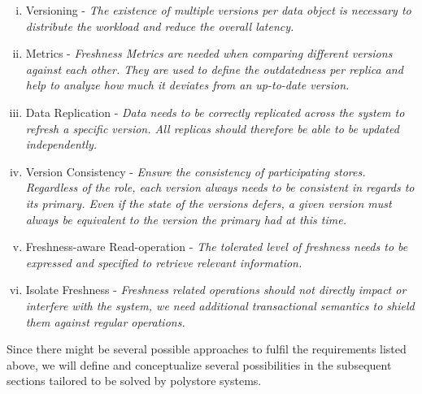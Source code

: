 \begin{enumerate}[(i)]
    \item Versioning -                      \textit{The existence of multiple versions per data object is necessary to distribute the workload 
                                            and reduce the overall latency.}

    \item Metrics -                         \textit{Freshness Metrics are needed when comparing different versions against each other.
                                            They are used to define the outdatedness per replica and help to analyze how much it deviates from an up-to-date version.}

    \item Data Replication -                \textit{Data needs to be correctly replicated across the system to refresh a specific version.
                                            All replicas should therefore be able to be updated independently.}

    \item Version Consistency -             \textit{Ensure the consistency of participating stores. Regardless of the role, each version always needs 
                                            to be consistent in regards to its primary. Even if the state of the versions defers, 
                                            a given version must always be equivalent to the version the primary had at this time.}
                                            
    \item Freshness-aware Read-operation -  \textit{The tolerated level of freshness needs to be expressed and specified to retrieve relevant information.}
    
    \item Isolate Freshness -               \textit{Freshness related operations should not directly impact or interfere with the system, 
                                            we need additional transactional semantics to shield them against regular operations.}                                    

\end{enumerate}

Since there might be several possible approaches to fulfil the requirements listed above, 
we will define and conceptualize several possibilities in the subsequent sections tailored to be solved by polystore systems. 


